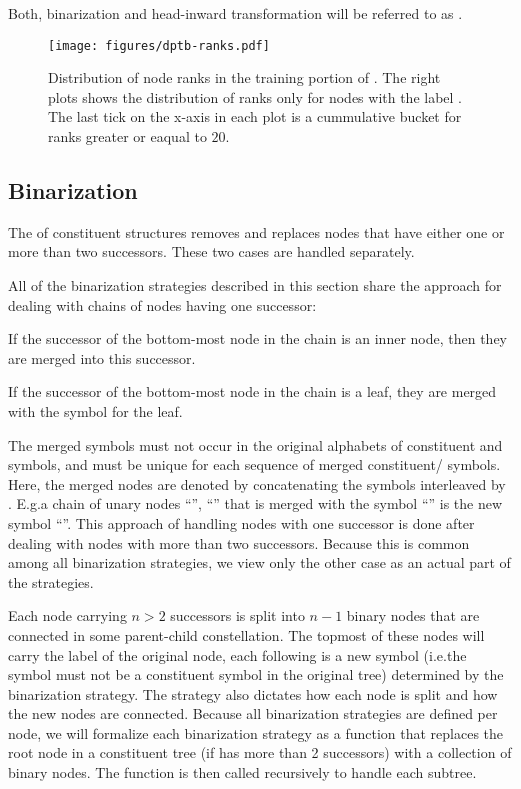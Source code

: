 \documentclass[../../document.tex]{subfiles}
\begin{document}
    Both, binarization and head-inward transformation will be referred to as .

    \begin{figure}
        \texttt{[image: figures/dptb-ranks.pdf]}
        \caption{\label{fig:extraction:ranks}
            Distribution of node ranks in the training portion of .
            The right plots shows the distribution of ranks only for nodes with the label .
            The last tick on the x-axis in each plot is a cummulative bucket for ranks greater or eaqual to \(20\).
        }
    \end{figure}

    \subsection{Binarization}\label{sec:binarization}
    The  of constituent structures removes and replaces nodes that have either one or more than two successors.
    These two cases are handled separately.

    All of the binarization strategies described in this section share the approach for dealing with chains of nodes having one successor:
    \begin{inparaenum}
        \item If the successor of the bottom-most node in the chain is an inner node, then they are merged into this successor.
        \item If the successor of the bottom-most node in the chain is a leaf, they are merged with the  symbol for the leaf.
    \end{inparaenum}
    The merged symbols must not occur in the original alphabets of constituent and  symbols, and must be unique for each sequence of merged constituent/ symbols.
    Here, the merged nodes are denoted by concatenating the symbols interleaved by \cn{+}.
    E.g.\@ a chain of unary nodes ``'', ``'' that is merged with the  symbol ``'' is the new symbol ``''.
    This approach of handling nodes with one successor is done after dealing with nodes with more than two successors.
    Because this is common among all binarization strategies, we view only the other case as an actual part of the strategies.

    Each node carrying \( n > 2 \) successors is split into \( n-1 \) binary nodes that are connected in some parent-child constellation.
    The topmost of these nodes will carry the label of the original node, each following is a new symbol (i.e.\@ the symbol must not be a constituent symbol in the original tree) determined by the binarization strategy.
    The strategy also dictates how each node is split and how the new nodes are connected.
    Because all binarization strategies are defined per node, we will formalize each binarization strategy as a function that replaces the root node in a constituent tree (if has more than 2 successors) with a collection of binary nodes.
    The function is then called recursively to handle each subtree.
\end{document}
